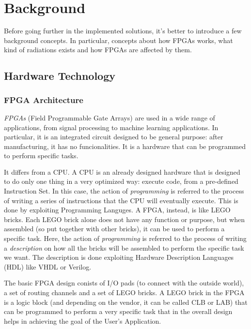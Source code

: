 \chapter{Background}
\label{sec:background}

Before going further in the implemented solutions, it's better to introduce a few background concepts. In particular, concepts about how FPGAs works, what kind of radiations exists and how FPGAs are affected by them.  

\section{Hardware Technology}

\subsection{FPGA Architecture}
\textit{FPGAs} (Field Programmable Gate Arrays) are used in a wide range of applications, from signal processing to machine learning applications. In particular, it is an integrated circuit designed to be general purpose: after manufacturing, it has no funcionalities. It is a hardware that can be programmed to perform specific tasks. \bigskip

It differs from a CPU. A CPU is an already designed hardware that is designed to do only one thing in a very optimized way: execute code, from a pre-defined Instruction Set. In this case, the action of \textit{programming} is referred to the process of writing a series of instructions that the CPU will eventually execute. This is done by exploiting Programming Languges. A FPGA, instead, is like LEGO bricks. Each LEGO brick alone does not have any function or purpose, but when assembled (so put together with other bricks), it can be used to perform a specific task. Here, the action of \textit{programming} is referred to the process of writing a \textit{description} on how all the bricks will be assembled to perform the specific task we want. The description is done exploiting Hardware Description Languages (HDL) like VHDL or Verilog. \bigskip

The basic FPGA design conists of I/O pads (to connect with the outside world), a set of routing channels and a set of LEGO bricks. A LEGO brick in the FPGA is a logic block (and depending on the vendor, it can be called CLB or LAB) that can be programmed to perform a very specific task that in the overall design helps in achieving the goal of the User's Application. 

